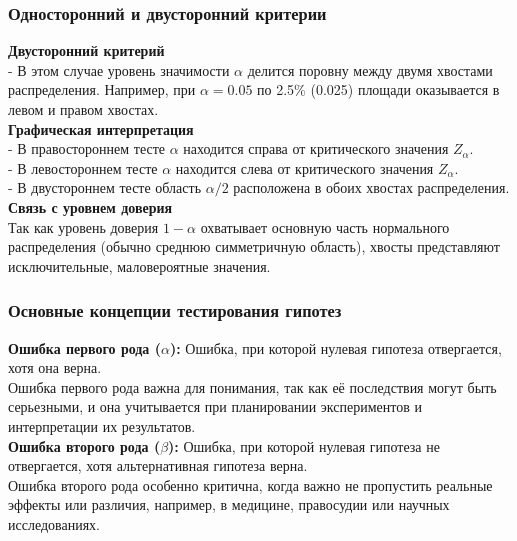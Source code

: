 \documentclass[aspectratio=169]{beamer}
\begin{document}
\begin{frame}
\frametitle{Односторонний и двусторонний критерии}
{\bf Двусторонний критерий}\\
- В этом случае уровень значимости \(\alpha\) делится поровну между двумя хвостами распределения. Например, при \(\alpha = 0.05\) по 2.5\% (0.025) площади оказывается в левом и правом хвостах.  
\newline\\
{\bf Графическая интерпретация}\\
- В правостороннем тесте \(\alpha\) находится справа от критического значения \(Z_{\alpha}\).\\
- В левостороннем тесте \(\alpha\) находится слева от критического значения \(Z_{\alpha}\).\\
- В двустороннем тесте область \(\alpha/2\) расположена в обоих хвостах распределения.  
\newline\\
{\bf Связь с уровнем доверия}\\
Так как уровень доверия \(1 - \alpha\) охватывает основную часть нормального распределения (обычно среднюю симметричную область), хвосты представляют исключительные, маловероятные значения.
\end{frame}

\begin{frame}
\frametitle{Основные концепции тестирования гипотез}
{\bf Ошибка первого рода ($\alpha$):} Ошибка, при которой нулевая гипотеза отвергается, хотя она верна.\\
Ошибка первого рода важна для понимания, так как её последствия могут быть серьезными, и она учитывается при планировании экспериментов и интерпретации их результатов.
\newline\\
{\bf Ошибка второго рода ($\beta$):} Ошибка, при которой нулевая гипотеза не отвергается, хотя альтернативная гипотеза верна.\\
Ошибка второго рода особенно критична, когда важно не пропустить реальные эффекты или различия, например, в медицине, правосудии или научных исследованиях.
\end{frame}
\end{document}
